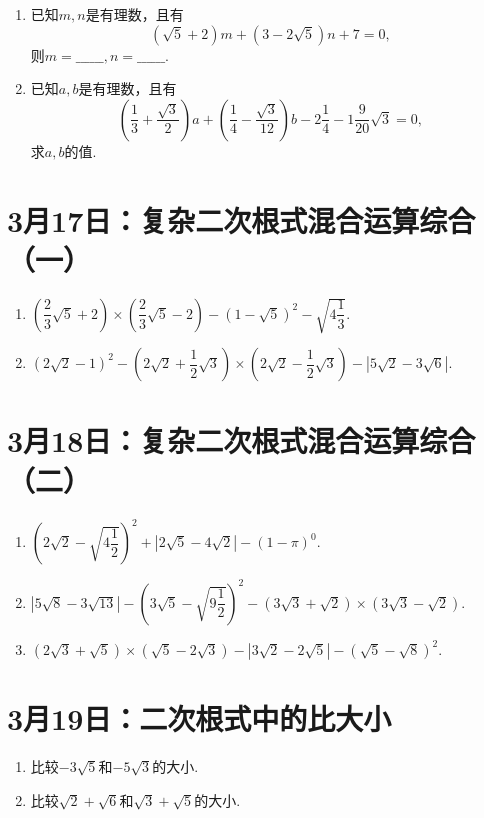 \begin{enumerate}
    \item 已知$m, n$是有理数，且有$$(\sqrt{5}+2)m+(3-2\sqrt{5})n+7=0,$$则$m=\_\_\_\_\_\_, n=\_\_\_\_\_\_.$
    \item 已知$a, b$是有理数，且有$$\left(\dfrac{1}{3}+\dfrac{\sqrt{3}}{2}\right)a+\left(\dfrac{1}{4}-\dfrac{\sqrt{3}}{12}\right)b-2\dfrac{1}{4}-1\dfrac{9}{20}\sqrt{3}=0,$$求$a, b$的值.
\end{enumerate}


\section*{3月17日：复杂二次根式混合运算综合（一）}

\begin{enumerate}
    \item $\left(\dfrac{2}{3}\sqrt{5}+2\right)\times\left(\dfrac{2}{3}\sqrt{5}-2\right)-(1-\sqrt{5})^2-\sqrt{4\dfrac{1}{3}}.$
    \item $(2\sqrt{2}-1)^2-\left(2\sqrt{2}+\dfrac{1}{2}\sqrt{3}\right)\times\left(2\sqrt{2}-\dfrac{1}{2}\sqrt{3}\right)-\left|5\sqrt{2}-3\sqrt{6}\right|.$
\end{enumerate}

\section*{3月18日：复杂二次根式混合运算综合（二）}

\begin{enumerate}
    \item $\left(2\sqrt{2}-\sqrt{4\dfrac{1}{2}}\right)^2+|2\sqrt{5}-4\sqrt{2}|-(1-\pi)^0.$
    \item $|5\sqrt{8}-3\sqrt{13}|-\left(3\sqrt{5}-\sqrt{9\dfrac{1}{2}}\right)^2-(3\sqrt{3}+\sqrt{2})\times(3\sqrt{3}-\sqrt{2}).$
    \item $(2\sqrt{3}+\sqrt{5})\times(\sqrt{5}-2\sqrt{3})-|3\sqrt{2}-2\sqrt{5}|-(\sqrt{5}-\sqrt{8})^2.$
\end{enumerate}


\newpage


\section*{3月19日：二次根式中的比大小}

\begin{enumerate}
    \item 比较$-3\sqrt{5}$和$-5\sqrt{3}$的大小.
    \item 比较$\sqrt{2}+\sqrt{6}$和$\sqrt{3}+\sqrt{5}$的大小.

\end{enumerate}






